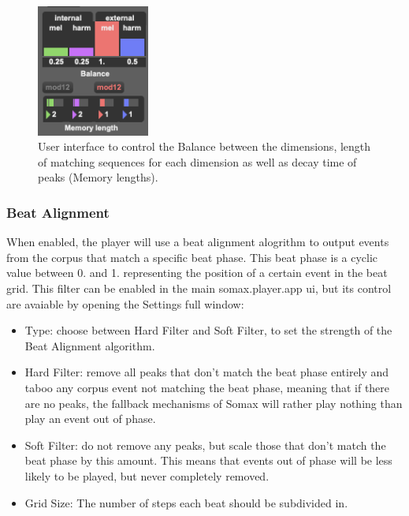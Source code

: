  \begin{figure}[h]
    \centering        
 	\includegraphics[width=0.33\textwidth]{img/atoms_ui_2-5.png}
    \caption{User interface to control the Balance between the dimensions, length of matching sequences for each dimension as well as decay time of peaks (Memory lengths).}
    \label{fig:atomui}
\end{figure}

\subsubsection{Beat Alignment}
When enabled, the player will use a beat alignment alogrithm to output events from the corpus that match a specific beat phase. This beat phase is a cyclic value between 0. and 1. representing the position of a certain event in the beat grid.
This filter can be enabled in the main somax.player.app ui, but its control are avaiable by opening the Settings full window:

\begin{itemize}
    \item Type: choose between Hard Filter and Soft Filter, to set the strength of the Beat Alignment algorithm. 

    \item Hard Filter: remove all peaks that don't match the beat phase entirely and taboo any corpus event not matching the beat phase, meaning that if there are no peaks, the fallback mechanisms of Somax will rather play nothing than play an event out of phase. 

    \item Soft Filter: do not remove any peaks, but scale those that don't match the beat phase by this amount. This means that events out of phase will be less likely to be played, but never completely removed. 

    \item Grid Size: The number of steps each beat should be subdivided in. 
\end{itemize}

